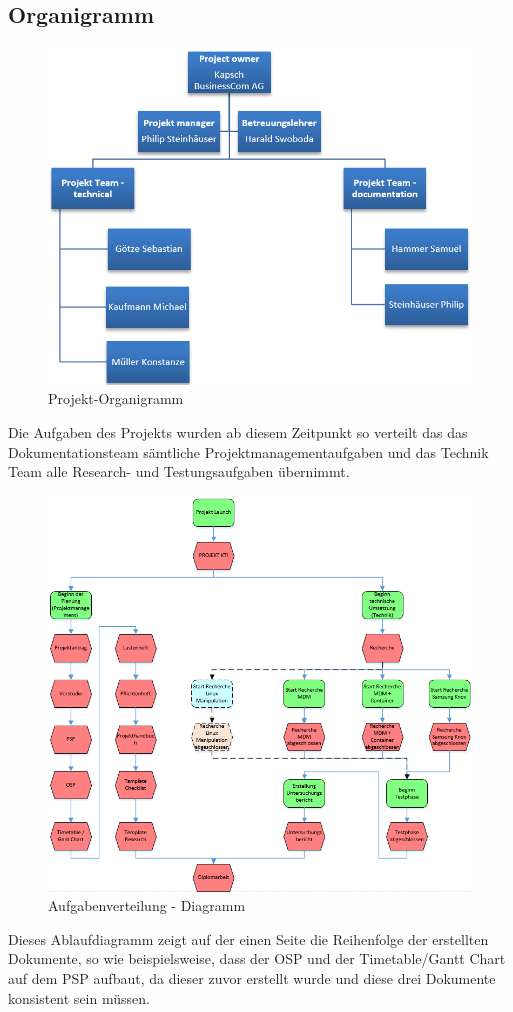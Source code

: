\subsection{Organigramm}
\begin{figure}[H]
	\centering
	\includegraphics[scale=0.6]{Images/organigramm}
	\caption{Projekt-Organigramm}
\end{figure}
Die Aufgaben des Projekts wurden ab diesem Zeitpunkt so verteilt das das Dokumentationsteam sämtliche Projektmanagementaufgaben und das Technik Team alle Research- und Testungsaufgaben übernimmt.
\begin{figure}[H]
	\includegraphics[scale=0.7]{Images/arbeitsteilung}
	\caption{Aufgabenverteilung - Diagramm}
\end{figure}
Dieses Ablaufdiagramm zeigt auf der einen Seite die Reihenfolge der erstellten Dokumente, so wie beispielsweise, dass der OSP und der Timetable/Gantt Chart auf dem PSP aufbaut, da dieser zuvor erstellt wurde und diese drei Dokumente konsistent sein müssen.
